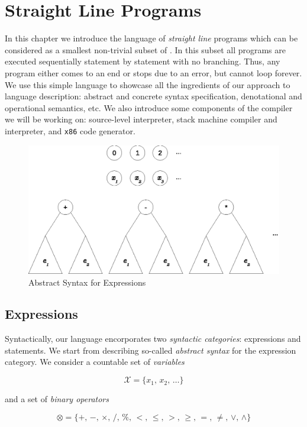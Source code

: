 \chapter{Straight Line Programs}

In this chapter we introduce the language of \emph{straight line} programs which can be considered as a smallest
non-trivial subset of \lama. In this subset all programs are executed sequentially statement by statement with
no branching. Thus, any program either comes to an end or stops due to an error, but cannot loop forever. We
use this simple language to showcase all the ingredients of our approach to language description: abstract and
concrete syntax specification, denotational and operational semantics, etc. We also introduce some components of
the compiler we will be working on: source-level interpreter, stack machine compiler and interpreter, and
\texttt{x86} code generator.

\begin{figure}[t]
  \centering
  \includegraphics[scale=0.7]{images/02-01.eps}
  \caption{Abstract Syntax for Expressions}
  \label{expression-syntax}
\end{figure}

\section{Expressions}


Syntactically, our language encorporates two \emph{syntactic categories}: expressions and statements. We start from describing
so-called \emph{abstract syntax} for the expression category. We consider a countable set of \emph{variables}

\[
\mathscr{X}=\{x_1,\,x_2,\,\dots\}
\]

and a set of \emph{binary operators}

\[
\otimes= \{+,\, -,\, \times,\, /,\, \%,\, <,\, \le,\, >,\, \ge,\, =,\,\ne,\, \vee,\, \wedge\}
\]

